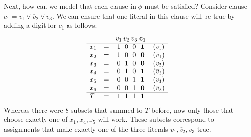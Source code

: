 \documentclass[11pt]{article}
\begin{document}
Next, how can we model that each clause in $\phi$ must be satisfied?
Consider clause $c_1 = v_1 \vee \overline v_2 \vee v_3$.
We can ensure that one literal in this clause will be true 
by adding a digit for $c_1$ as follows:
\[\begin{array}{llc@{\,}c@{\,}c@{~}cl}
&& v_1 & v_2 & v_3 & \mathbf c_1 \\\hline
  x_1 &=& 1& 0& 0 & \mathbf 1  & ( v_1)\\
  x_2 &=& 1& 0& 0 & \mathbf 0  & (\overline v_1)\\
  x_3 &=& 0& 1& 0 & \mathbf 0  & (v_2)\\
  x_4 &=& 0& 1& 0 & \mathbf 1  & (\overline v_2)\\
  x_5 &=& 0& 0& 1 & \mathbf 1  & (v_3)\\
  x_6 &=& 0& 0& 1 & \mathbf 0 & (\overline v_3)\\\hline
  T & = & 1& 1& 1 & \mathbf 1
\end{array}\]
Whereas there were 8 subsets that summed to $T$ before,
now only those that choose exactly one of $x_1, x_4, x_5$ will work.
These subsets correspond to assignments 
that make exactly one of the three literals $v_1, \overline v_2, v_3$ true.
\end{document}
